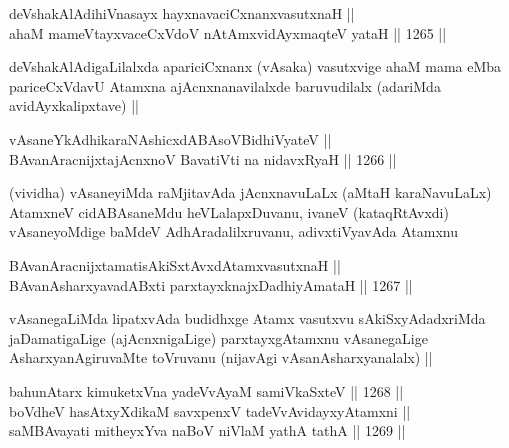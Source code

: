
\begin{shl}
deVshakAlAdihiVnasayx hayxnavaciCxnanxvasutxnaH || \\
ahaM mameVtayxvaceCxVdoV nA\s \s tAmxvidAyxmaqteV yataH ||  1265 ||  
\end{shl}

\begin{artha}
deVshakAlAdigaLilalxda apariciCxnanx (vAsaka) vasutxvige ahaM mama eMba pariceCxVdavU Atamxna ajAcnxnanavilalxde baruvudilalx (adariMda avidAyxkalipxtave) ||
\end{artha}

\begin{shl}
vAsaneYkAdhikaraNAshicxdABAsoV\s BidhiVyateV || \\
BAvanAracnijxtajAcnxnoV BavatiVti na nidavxRyaH ||  1266 ||  
\end{shl}

\begin{artha}
(vividha) vAsaneyiMda raMjitavAda jAcnxnavuLaLx (aMtaH karaNavuLaLx) AtamxneV cidABAsaneMdu heVLalapxDuvanu, ivaneV (kataqRtAvxdi) vAsaneyoMdige baMdeV AdhAradalilxruvanu, adivxtiVyavAda Atamxnu
\end{artha}


\begin{shl}
BAvanAracnijxtamatisAkiSxtAvxdAtamxvasutxnaH || \\
BAvanAsharxyavadABxti parxtayxknajxDadhiyAmataH ||  1267 ||  
\end{shl}

\begin{artha}
vAsanegaLiMda lipatxvAda budidhxge Atamx vasutxvu sAkiSxyAdadxriMda jaDamatigaLige (ajAcnxnigaLige) parxtayxgAtamxnu vAsanegaLige AsharxyanAgiruvaMte toVruvanu (nijavAgi vAsanAsharxyanalalx) ||
\end{artha}


\begin{shl}
bahunA\s tarx kimuketxVna yadeVvAyaM samiVkaSxteV ||  1268 ||  \\
boVdheV hasAtxyXdikaM savxpenxV tadeVvAvidayxyA\s \s tamxni ||  \\
saMBAvayati mitheyxYva naBoV niVlaM yathA tathA ||  1269 ||  
\end{shl}

